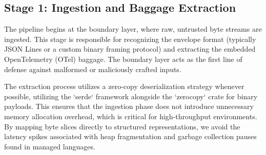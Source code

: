 \subsection{Stage 1: Ingestion and Baggage Extraction}
The pipeline begins at the boundary layer, where raw, untrusted byte streams are ingested. This stage is responsible for recognizing the envelope format (typically JSON Lines or a custom binary framing protocol) and extracting the embedded OpenTelemetry (OTel) baggage. The boundary layer acts as the first line of defense against malformed or maliciously crafted inputs.

The extraction process utilizes a zero-copy deserialization strategy whenever possible, utilizing the `serde` framework alongside the `zerocopy` crate for binary payloads. This ensures that the ingestion phase does not introduce unnecessary memory allocation overhead, which is critical for high-throughput environments. By mapping byte slices directly to structured representations, we avoid the latency spikes associated with heap fragmentation and garbage collection pauses found in managed languages.

